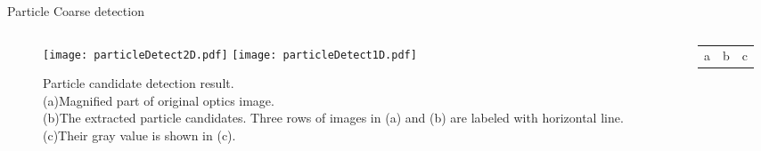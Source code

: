 \documentclass[14pt,hyperref={CJKbookmarks=true}]{beamer}
\theoremstyle{plain}
\theoremstyle{definition}
\theoremstyle{remark}
\begin{document}
\begin{frame}{Particle Coarse detection}
\begin{columns}[onlytextwidth]
\begin{column}{0.9\textwidth}
\begin{figure}
\centering
\texttt{[image: particleDetect2D.pdf]}
\texttt{[image: particleDetect1D.pdf]}
\caption{Particle candidate detection result. \\
(a)Magnified part of original optics image. \\
(b)The extracted particle candidates. Three rows of images in (a) and (b) are labeled with horizontal line. \\
(c)Their gray value is shown in (c).} 
\end{figure}
\end{column}
\begin{column}{0.1\textwidth}
\scriptsize
\begin{tabular}{c|c|c}
a&b&c
\end{tabular}
\end{column}
\end{columns}

\end{frame}
\end{document}
